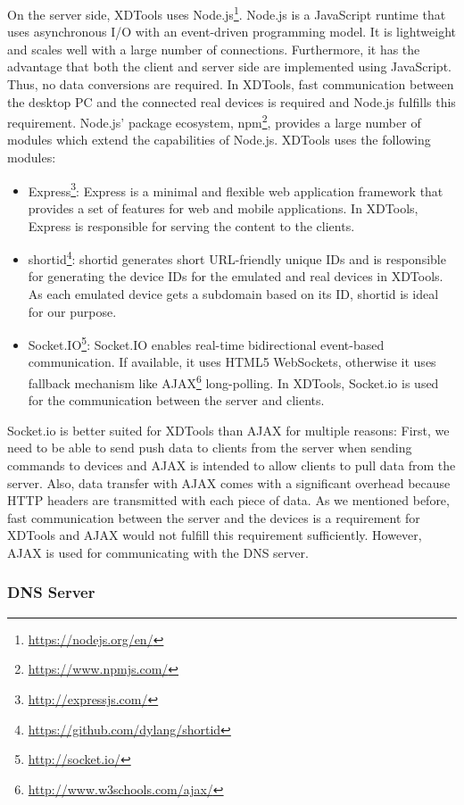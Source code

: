 On the server side, XDTools uses Node.js\footnote{\url{https://nodejs.org/en/}}. Node.js is a JavaScript runtime that uses asynchronous I/O with an event-driven programming model. It is lightweight and scales well with a large number of connections. Furthermore, it has the advantage that both the client and server side are implemented using JavaScript. Thus, no data conversions are required. In XDTools, fast communication between the desktop PC and the connected real devices is required and Node.js fulfills this requirement. Node.js' package ecosystem, npm\footnote{\url{https://www.npmjs.com/}}, provides a large number of modules which extend the capabilities of Node.js. XDTools uses the following modules: 
\begin{itemize}
	\item Express\footnote{\url{http://expressjs.com/}}: Express is a minimal and flexible web application framework that provides a set of features for web and mobile applications. In XDTools, Express is responsible for serving the content to the clients.
	\item shortid\footnote{\url{https://github.com/dylang/shortid}}: shortid generates short URL-friendly unique IDs and is responsible for generating the device IDs for the emulated and real devices in XDTools. As each emulated device gets a subdomain based on its ID, shortid is ideal for our purpose.
	\item Socket.IO\footnote{\url{http://socket.io/}}: Socket.IO enables real-time bidirectional event-based communication. If available, it uses HTML5 WebSockets, otherwise it uses fallback mechanism like AJAX\footnote{\url{http://www.w3schools.com/ajax/}} long-polling. In XDTools, Socket.io is used for the communication between the server and clients.
\end{itemize}

Socket.io is better suited for XDTools than AJAX for multiple reasons: First, we need to be able to send push data to clients from the server when sending commands to devices and AJAX is intended to allow clients to pull data from the server. Also, data transfer with AJAX comes with a significant overhead because HTTP headers are transmitted with each piece of data. As we mentioned before, fast communication between the server and the devices is a requirement for XDTools and AJAX would not fulfill this requirement sufficiently. However, AJAX is used for communicating with the DNS server.

\subsubsection{DNS Server}

